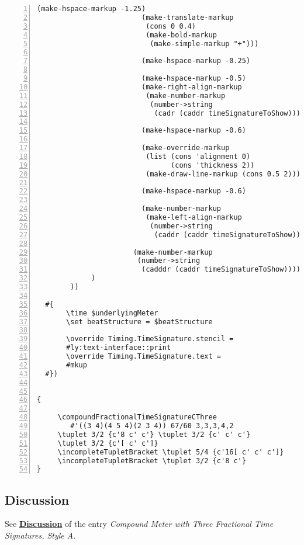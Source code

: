 \begin{Verbatim}[numbers=left,xleftmargin=5mm]
                         (make-hspace-markup -1.25)
                         (make-translate-markup
                          (cons 0 0.4)
                          (make-bold-markup
                           (make-simple-markup "+")))

                         (make-hspace-markup -0.25)

                         (make-hspace-markup -0.5)
                         (make-right-align-markup
                          (make-number-markup
                           (number->string
                            (cadr (caddr timeSignatureToShow)))))

                         (make-hspace-markup -0.6)

                         (make-override-markup
                          (list (cons 'alignment 0)
                                (cons 'thickness 2))
                          (make-draw-line-markup (cons 0.5 2)))

                         (make-hspace-markup -0.6)

                         (make-number-markup
                          (make-left-align-markup
                           (number->string
                            (caddr (caddr timeSignatureToShow)))))))

                       (make-number-markup
                        (number->string
                         (cadddr (caddr timeSignatureToShow)))))))))
             )
        ))

  #{
       \time $underlyingMeter
       \set beatStructure = $beatStructure

       \override Timing.TimeSignature.stencil =
       #ly:text-interface::print
       \override Timing.TimeSignature.text =
       #mkup
  #})


{

     \compoundFractionalTimeSignatureCThree 
     	#'((3 4)(4 5 4)(2 3 4)) 67/60 3,3,3,4,2
     \tuplet 3/2 {c'8 c' c'} \tuplet 3/2 {c' c' c'}
     \tuplet 3/2 {c'[ c' c']}
     \incompleteTupletBracket \tuplet 5/4 {c'16[ c' c' c']}
     \incompleteTupletBracket \tuplet 3/2 {c'8 c'}
}

\end{Verbatim}


\subsection{Discussion}
See \hyperref[sec:compoundfractionalmeter_discussion_two]{\textbf{Discussion}} of the entry \textit{Compound Meter with Three Fractional Time Signatures, Style A.}


